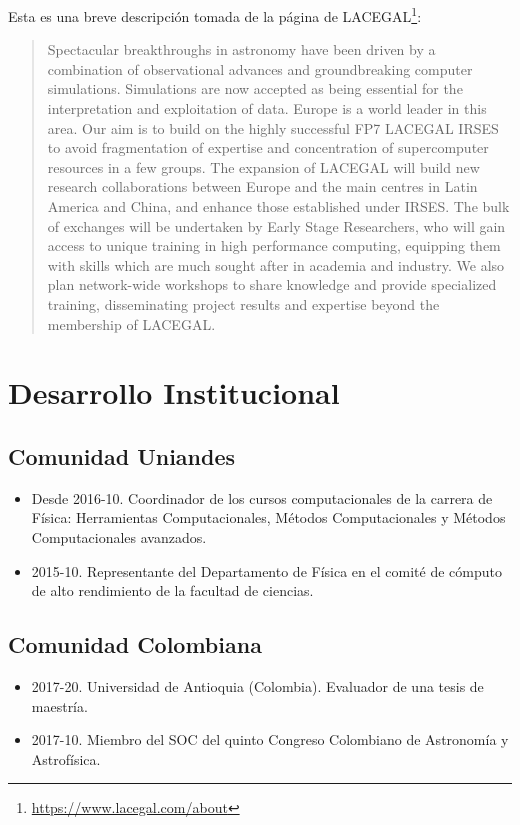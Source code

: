 \documentclass{article}
\begin{document}
\begin{itemize}
Esta es una breve descripci\'on tomada de la p\'agina de LACEGAL\footnote{\url{https://www.lacegal.com/about}}:
\begin{quote}
Spectacular breakthroughs in astronomy have been driven by a combination of observational advances and groundbreaking computer simulations. Simulations are now accepted as being essential for the interpretation and exploitation of data. Europe is a world leader in this area. Our aim is to build on the highly successful FP7 LACEGAL IRSES to avoid fragmentation of expertise and concentration of supercomputer resources in a few groups. The expansion of LACEGAL will build new research collaborations between Europe and the main centres in Latin America and China, and enhance those established under IRSES. The bulk of exchanges will be undertaken by Early Stage Researchers, who will gain access to unique training in high performance computing, equipping them with skills which are much sought after in academia and industry. We also plan network-wide workshops to share knowledge and provide specialized training, disseminating project results and expertise beyond the membership of LACEGAL.
\end{quote}
\end{itemize}



\newpage
\section{Desarrollo Institucional}


\subsection{Comunidad Uniandes}
\begin{itemize}
\item {Desde 2016-10. Coordinador de los cursos computacionales de la carrera de
  F\'isica: Herramientas Computacionales, M\'etodos Computacionales y
  M\'etodos Computacionales avanzados.} 
\item {2015-10. Representante del Departamento de F\'isica en el comit\'e
  de c\'omputo de alto rendimiento de la facultad de ciencias.}
\end{itemize}


\subsection{Comunidad Colombiana}

\begin{itemize}
\item 2017-20. Universidad de Antioquia (Colombia). Evaluador de una tesis de
  maestr\'ia.  
\item 2017-10. Miembro del SOC del quinto Congreso Colombiano de Astronom\'ia y
  Astrof\'isica.
\end{itemize}
\end{document}
